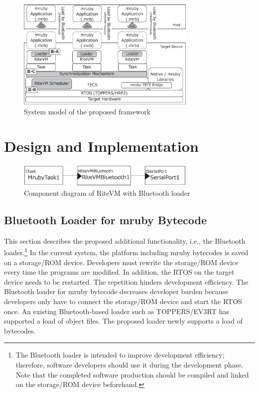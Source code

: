 \documentclass[conference]{IEEEtran/IEEEtran/IEEEtran}
\begin{document}
\begin{figure}[t]
    \centering
    \includegraphics[width=8.6cm,clip]{figure/system_model.eps}
    \vspace{-3mm}
\caption{System model of the proposed framework}
    \vspace{-3mm}
\label{fig:system_model}
\end{figure}

\section{Design and Implementation}
\label{sec:Design and Implementation}

\begin{figure}[t]
    \centering
    \includegraphics[width=8.6cm,clip]{figure/component_bluetooth.eps}
    \vspace{-3mm}
\caption{Component diagram of RiteVM with Bluetooth loader}
    \vspace{-3mm}
\label{fig:component_bluetooth}
\end{figure}

\subsection{Bluetooth Loader for mruby Bytecode}
\label{sec:Bluetooth loader for mruby bytecode}
This section describes the proposed additional functionality, i.e., the Bluetooth loader.\footnote{
The Bluetooth loader is intended to improve development efficiency; therefore, software developers should use it during the development phase.
Note that the completed software production should be compiled and linked on the storage/ROM device beforehand.
}
In the current system, the platform including mruby bytecodes is saved on a storage/ROM device.
Developers must rewrite the storage/ROM device every time the programs are modified.
In addition, the RTOS on the target device needs to be restarted.
The repetition hinders development efficiency.
The Bluetooth loader for mruby bytecode decreases developer burden because developers only have to connect the storage/ROM device and start the RTOS once. 
An existing Bluetooth-based loader such as TOPPERS/EV3RT \cite{par:EV3} has supported a load of object files.
The proposed loader newly supports a load of bytecodes.
\end{document}
